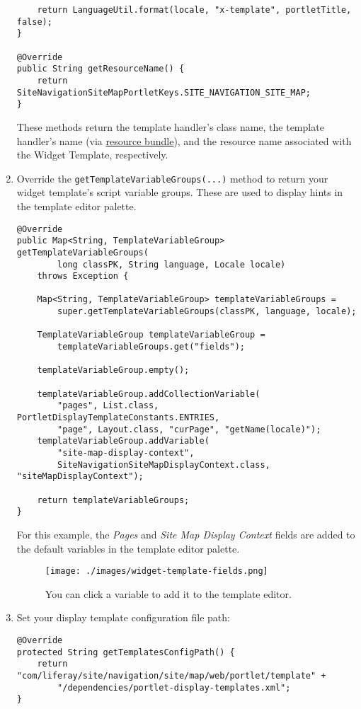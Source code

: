 \begin{enumerate}
\begin{verbatim}
    return LanguageUtil.format(locale, "x-template", portletTitle, false);
}

@Override
public String getResourceName() {
    return SiteNavigationSiteMapPortletKeys.SITE_NAVIGATION_SITE_MAP;
}
\end{verbatim}

  These methods return the template handler's class name, the template
  handler's name (via
  \href{/docs/7-2/frameworks/-/knowledge_base/f/localization}{resource
  bundle}), and the resource name associated with the Widget Template,
  respectively.
\item
  Override the \texttt{getTemplateVariableGroups(...)} method to return
  your widget template's script variable groups. These are used to
  display hints in the template editor palette.

\begin{verbatim}
@Override
public Map<String, TemplateVariableGroup> getTemplateVariableGroups(
        long classPK, String language, Locale locale)
    throws Exception {

    Map<String, TemplateVariableGroup> templateVariableGroups =
        super.getTemplateVariableGroups(classPK, language, locale);

    TemplateVariableGroup templateVariableGroup =
        templateVariableGroups.get("fields");

    templateVariableGroup.empty();

    templateVariableGroup.addCollectionVariable(
        "pages", List.class, PortletDisplayTemplateConstants.ENTRIES,
        "page", Layout.class, "curPage", "getName(locale)");
    templateVariableGroup.addVariable(
        "site-map-display-context",
        SiteNavigationSiteMapDisplayContext.class, "siteMapDisplayContext");

    return templateVariableGroups;
}
\end{verbatim}

  For this example, the \emph{Pages} and \emph{Site Map Display Context}
  fields are added to the default variables in the template editor
  palette.

  \begin{figure}
  \centering
  \texttt{[image: ./images/widget-template-fields.png]}
  \caption{You can click a variable to add it to the template editor.}
  \end{figure}
\item
  Set your display template configuration file path:

\begin{verbatim}
@Override
protected String getTemplatesConfigPath() {
    return "com/liferay/site/navigation/site/map/web/portlet/template" +
        "/dependencies/portlet-display-templates.xml";
}
\end{verbatim}


\end{enumerate}
